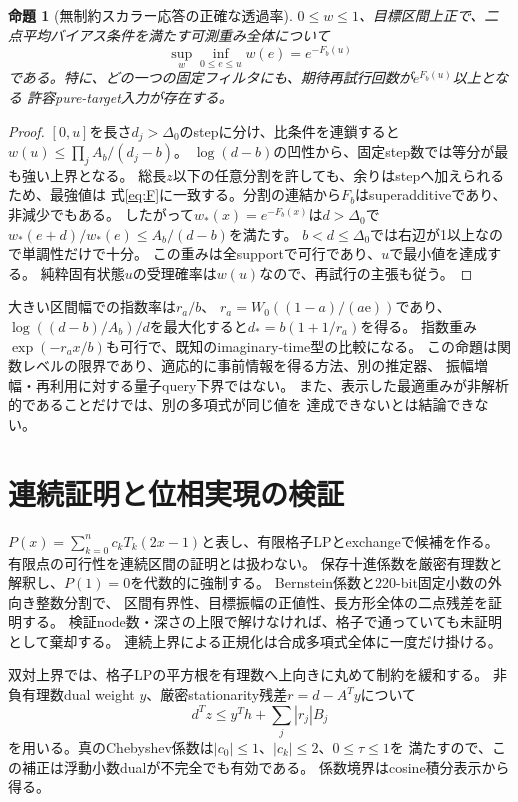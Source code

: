 \documentclass[11pt,a4paper]{article}
\newtheorem{proposition}[theorem]{命題}
\begin{document}
\begin{proposition}[無制約スカラー応答の正確な透過率]\label{prop:prior}
$0\leq w\leq1$、目標区間上正で、二点平均バイアス条件を満たす可測重み全体について
\begin{equation}\label{eq:priorbound}
 \sup_w\inf_{0\leq e\leq u}w(e)=e^{-F_b(u)}
\end{equation}
である。特に、どの一つの固定フィルタにも、期待再試行回数が$e^{F_b(u)}$以上となる
許容pure-target入力が存在する。
\end{proposition}
\begin{proof}
$[0,u]$を長さ$d_j>\Delta_0$のstepに分け、比条件を連鎖すると
$w(u)\leq\prod_j A_b/(d_j-b)$。
$\log(d-b)$の凹性から、固定step数では等分が最も強い上界となる。
総長$z$以下の任意分割を許しても、余りはstepへ加えられるため、最強値は
式\eqref{eq:F}に一致する。分割の連結から$F_b$はsuperadditiveであり、非減少でもある。
したがって$w_*(x)=e^{-F_b(x)}$は$d>\Delta_0$で
$w_*(e+d)/w_*(e)\leq A_b/(d-b)$を満たす。
$b<d\leq\Delta_0$では右辺が1以上なので単調性だけで十分。
この重みは全supportで可行であり、$u$で最小値を達成する。
純粋固有状態$u$の受理確率は$w(u)$なので、再試行の主張も従う。
\end{proof}
大きい区間幅での指数率は$r_a/b$、
$r_a=W_0((1-a)/(a\mathrm e))$であり、
$\log((d-b)/A_b)/d$を最大化すると$d_*=b(1+1/r_a)$を得る。
指数重み$\exp(-r_ax/b)$も可行で、既知のimaginary-time型の比較になる。
この命題は関数レベルの限界であり、適応的に事前情報を得る方法、別の推定器、
振幅増幅・再利用に対する量子query下界ではない。
また、表示した最適重みが非解析的であることだけでは、別の多項式が同じ値を
達成できないとは結論できない。

\section{連続証明と位相実現の検証}\label{sec:cert}
$P(x)=\sum_{k=0}^n c_kT_k(2x-1)$と表し、有限格子LPとexchangeで候補を作る。
有限点の可行性を連続区間の証明とは扱わない。
保存十進係数を厳密有理数と解釈し、$P(1)=0$を代数的に強制する。
Bernstein係数と220-bit固定小数の外向き整数分割\cite{Farouki}で、
区間有界性、目標振幅の正値性、長方形全体の二点残差を証明する。
検証node数・深さの上限で解けなければ、格子で通っていても未証明として棄却する。
連続上界による正規化は合成多項式全体に一度だけ掛ける。

双対上界では、格子LPの平方根を有理数へ上向きに丸めて制約を緩和する。
非負有理数dual weight $y$、厳密stationarity残差$r=d-A^Ty$について
\begin{equation}\label{eq:dual}
 d^Tz\leq y^Th+\sum_j|r_j|B_j
\end{equation}
を用いる。真のChebyshev係数は$|c_0|\leq1$、$|c_k|\leq2$、$0\leq\tau\leq1$を
満たすので、この補正は浮動小数dualが不完全でも有効である。
係数境界はcosine積分表示から得る。
\end{document}
